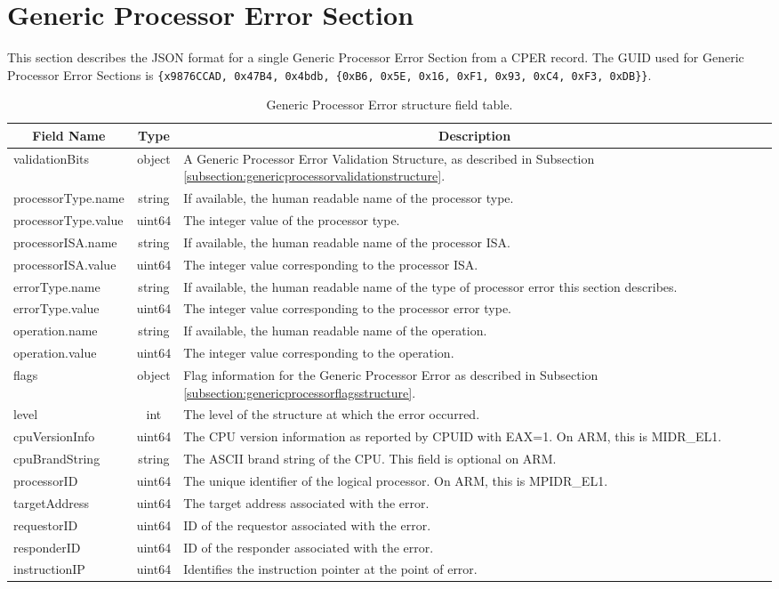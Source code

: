 \documentclass{report}
\newcommand*{\thead}[1]{\multicolumn{1}{|c|}{\bfseries #1}}
\newcommand*{\jsontable}[1]{
    \begin{table}[!ht]
    \label{#1}
    \centering
    \begin{adjustbox}{center}
    \begin{tabular}{|l|c|p{8cm}|}
    \hline
    \thead{Field Name} & \thead{Type} & \thead{Description} \\
    \hline
}
\newcommand*{\jsontableend}[1]{
    \hline
    \end{tabular}
    \end{adjustbox}
    \caption{#1}
    \label{table:#1}
    \end{table}
    \FloatBarrier
}
\begin{document}
\section{Generic Processor Error Section}
\label{section:genericprocessorerrorsection}
This section describes the JSON format for a single Generic Processor Error Section from a CPER record. The GUID used for Generic Processor Error Sections is \texttt{\{x9876CCAD, 0x47B4, 0x4bdb, \{0xB6, 0x5E, 0x16, 0xF1, 0x93, 0xC4, 0xF3, 0xDB\}\}}.
\jsontable{table:genericprocessorerrorsection}
validationBits & object & A Generic Processor Error Validation Structure, as described in Subsection \ref{subsection:genericprocessorvalidationstructure}.\\
\hline
processorType.name & string & If available, the human readable name of the processor type.\\
processorType.value & uint64 & The integer value of the processor type.\\
\hline
processorISA.name & string & If available, the human readable name of the processor ISA.\\
processorISA.value & uint64 & The integer value corresponding to the processor ISA.\\
\hline
errorType.name & string & If available, the human readable name of the type of processor error this section describes.\\
errorType.value & uint64 & The integer value corresponding to the processor error type.\\
\hline
operation.name & string & If available, the human readable name of the operation.\\
operation.value & uint64 & The integer value corresponding to the operation.\\
\hline
flags & object & Flag information for the Generic Processor Error as described in Subsection \ref{subsection:genericprocessorflagsstructure}.\\
\hline
level & int & The level of the structure at which the error occurred.\\
\hline
cpuVersionInfo & uint64 & The CPU version information as reported by CPUID with EAX=1. On ARM, this is MIDR\_EL1.\\
\hline
cpuBrandString & string & The ASCII brand string of the CPU. This field is optional on ARM.\\
\hline
processorID & uint64 & The unique identifier of the logical processor. On ARM, this is MPIDR\_EL1.\\
\hline
targetAddress & uint64 & The target address associated with the error.\\
\hline
requestorID & uint64 & ID of the requestor associated with the error.\\
\hline
responderID & uint64 & ID of the responder associated with the error.\\
\hline
instructionIP & uint64 & Identifies the instruction pointer at the point of error.\\
\jsontableend{Generic Processor Error structure field table.}
\end{document}
